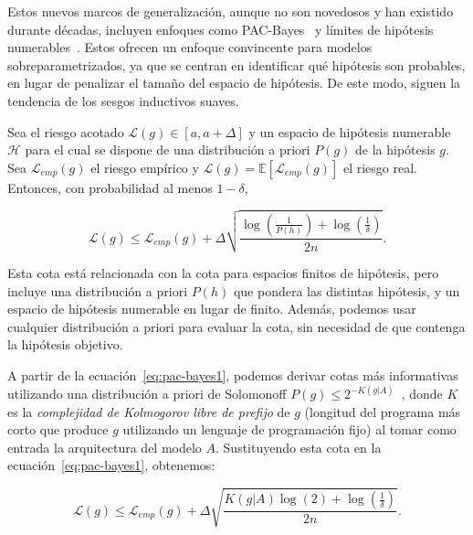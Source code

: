 Estos nuevos marcos de generalización, aunque no son novedosos y han existido durante décadas, incluyen enfoques como PAC-Bayes~\cite{McAllester1999} y límites de hipótesis numerables~\cite{Valiant1984}. Estos ofrecen un enfoque convincente para modelos sobreparametrizados, ya que se centran en identificar qué hipótesis son probables, en lugar de penalizar el tamaño del espacio de hipótesis. De este modo, siguen la tendencia de los sesgos inductivos suaves.

\begin{teorema}
    Sea el riesgo acotado $\mathcal{L}(g) \in [a, a + \Delta]$ y un espacio de hipótesis numerable $\mathcal{H}$ para el cual se dispone de una distribución a priori $P(g)$ de la hipótesis $g$. Sea $\mathcal{L}_{emp}(g)$ el riesgo empírico y $\mathcal{L}(g) = \mathbb{E}[\mathcal{L}_{emp}(g)]$ el riesgo real. Entonces, con probabilidad al menos $1 - \delta$,

    \begin{equation}\label{eq:pac-bayes1}
        \mathcal{L}(g) \leq \mathcal{L}_{emp}(g) + \Delta \sqrt{ \frac{ \log \left( \frac{1}{P(h)} \right) + \log \left( \frac{1}{\delta} \right)}{2n}}.
    \end{equation}
    
\end{teorema}
    
Esta cota está relacionada con la cota para espacios finitos de hipótesis, pero incluye una distribución a priori $P(h)$ que pondera las distintas hipótesis, y un espacio de hipótesis numerable en lugar de finito. Además, podemos usar cualquier distribución a priori para evaluar la cota, sin necesidad de que contenga la hipótesis objetivo.

A partir de la ecuación~\eqref{eq:pac-bayes1}, podemos derivar cotas más informativas utilizando una distribución a priori de Solomonoff $P(g) \leq 2^{-K(g|A)}$~\cite{Solomonoff1964}, donde $K$ es la \textit{complejidad de Kolmogorov libre de prefijo} de $g$ (longitud del programa más corto que produce $g$ utilizando un lenguaje de programación fijo) al tomar como entrada la arquitectura del modelo $A$. Sustituyendo esta cota en la ecuación~\eqref{eq:pac-bayes1}, obtenemos:

\begin{equation}\label{eq:pac-bayes2}
    \mathcal{L}(g) \leq \mathcal{L}_{emp}(g) + \Delta \sqrt{ \frac{ K(g|A)\log (2) + \log \left( \frac{1}{\delta} \right) }{2n} }.
\end{equation}

